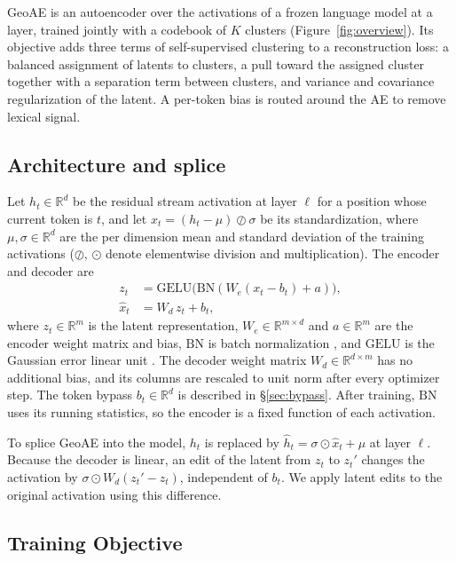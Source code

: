 \documentclass[11pt]{article}
\begin{document}
GeoAE is an autoencoder over the activations of a frozen language model at a layer, trained jointly with a codebook of $K$ clusters (Figure~\ref{fig:overview}).
Its objective adds three terms of self-supervised clustering to a reconstruction loss: a balanced assignment of latents to clusters, a pull toward the assigned cluster together with a separation term between clusters, and variance and covariance regularization of the latent. A per-token bias is routed around the AE to remove lexical signal.

\subsection{Architecture and splice}

Let $h_t \in \mathbb{R}^{d}$ be the residual stream activation at layer $\ell$ for a position whose current token is $t$, and let $x_t = (h_t - \mu) \oslash \sigma$ be its standardization, where $\mu, \sigma \in \mathbb{R}^{d}$ are the per dimension mean and standard deviation of the training activations ($\oslash$, $\odot$ denote elementwise division and multiplication).
The encoder and decoder are
\begin{align}
  z_t &= \mathrm{GELU}\big(\mathrm{BN}(W_e (x_t - b_t) + a)\big), \label{eq:ae} \\
  \hat{x}_t &= W_d\, z_t + b_t, \nonumber
\end{align}
where $z_t \in \mathbb{R}^{m}$ is the latent representation, $W_e \in \mathbb{R}^{m\times d}$ and $a \in \mathbb{R}^{m}$ are the encoder weight matrix and bias, $\mathrm{BN}$ is batch normalization \citep{ioffe2015batchnorm}, and $\mathrm{GELU}$ is the Gaussian error linear unit \citep{hendrycks2016gelu}. The decoder weight matrix $W_d \in \mathbb{R}^{d\times m}$ has no additional bias, and its columns are rescaled to unit norm after every optimizer step. The token bypass $b_t \in \mathbb{R}^{d}$ is described in \S\ref{sec:bypass}. After training, $\mathrm{BN}$ uses its running statistics, so the encoder is a fixed function of each activation.

To splice GeoAE into the model, $h_t$ is replaced by $\hat{h}_t = \sigma \odot \hat{x}_t + \mu$ at layer $\ell$. Because the decoder is linear, an edit of the latent from $z_t$ to $z_t'$ changes the activation by $\sigma \odot W_d (z_t' - z_t)$, independent of $b_t$. We apply latent edits to the original activation using this difference.



\subsection{Training Objective}
\end{document}
